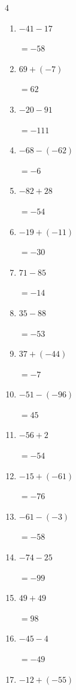 \begin{multicols}{4}
\begin{enumerate}
        $=-123$

  \item $-41-17$

        $=-58$

  \item $69+(-7)$

        $=62$

  \item $-20-91$

        $=-111$

  \item $-68-(-62)$

        $=-6$

  \item $-82+28$

        $=-54$

  \item $-19+(-11)$

        $=-30$

\columnbreak %

  \item $71-85$

        $=-14$

  \item $35-88$

        $=-53$

  \item $37+(-44)$

        $=-7$

  \item $-51-(-96)$

        $=45$

  \item $-56+2$

        $=-54$

  \item $-15+(-61)$

        $=-76$

  \item $-61-(-3)$

        $=-58$

  \item $-74-25$

        $=-99$

  \item $49+49$

        $=98$

  \item $-45-4$

        $=-49$

  \item $-12+(-55)$


\end{enumerate}
\end{multicols}
